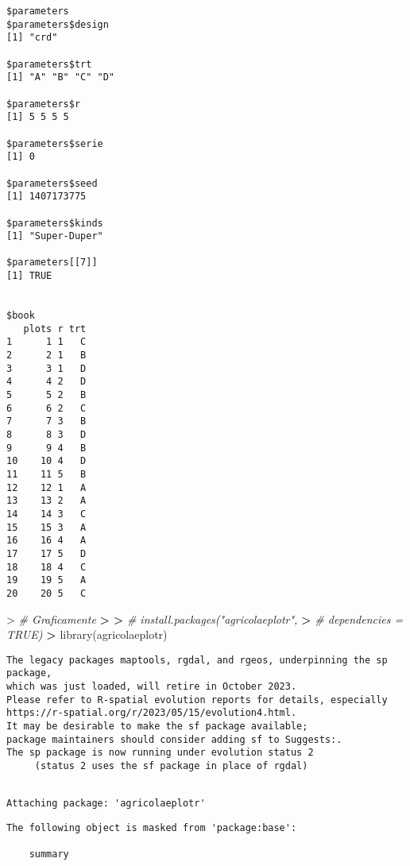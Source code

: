 \documentclass[
]{book}
\newenvironment{Shaded}{\begin{snugshade}}{\end{snugshade}}
\newcommand{\CommentTok}[1]{\textcolor[rgb]{0.56,0.35,0.01}{\textit{#1}}}
\newcommand{\ErrorTok}[1]{\textcolor[rgb]{0.64,0.00,0.00}{\textbf{#1}}}
\newcommand{\FunctionTok}[1]{\textcolor[rgb]{0.00,0.00,0.00}{#1}}
\newcommand{\NormalTok}[1]{#1}
\newcommand{\SpecialCharTok}[1]{\textcolor[rgb]{0.00,0.00,0.00}{#1}}
\begin{document}
\begin{verbatim}
$parameters
$parameters$design
[1] "crd"

$parameters$trt
[1] "A" "B" "C" "D"

$parameters$r
[1] 5 5 5 5

$parameters$serie
[1] 0

$parameters$seed
[1] 1407173775

$parameters$kinds
[1] "Super-Duper"

$parameters[[7]]
[1] TRUE


$book
   plots r trt
1      1 1   C
2      2 1   B
3      3 1   D
4      4 2   D
5      5 2   B
6      6 2   C
7      7 3   B
8      8 3   D
9      9 4   B
10    10 4   D
11    11 5   B
12    12 1   A
13    13 2   A
14    14 3   C
15    15 3   A
16    16 4   A
17    17 5   D
18    18 4   C
19    19 5   A
20    20 5   C
\end{verbatim}

\begin{Shaded}
\begin{Highlighting}[]
\SpecialCharTok{\textgreater{}} \CommentTok{\# Graficamente}
\ErrorTok{\textgreater{}} 
\ErrorTok{\textgreater{}} \CommentTok{\# install.packages("agricolaeplotr", }
\ErrorTok{\textgreater{}} \CommentTok{\#                  dependencies = TRUE)}
\ErrorTok{\textgreater{}} \FunctionTok{library}\NormalTok{(agricolaeplotr)}
\end{Highlighting}
\end{Shaded}

\begin{verbatim}
The legacy packages maptools, rgdal, and rgeos, underpinning the sp package,
which was just loaded, will retire in October 2023.
Please refer to R-spatial evolution reports for details, especially
https://r-spatial.org/r/2023/05/15/evolution4.html.
It may be desirable to make the sf package available;
package maintainers should consider adding sf to Suggests:.
The sp package is now running under evolution status 2
     (status 2 uses the sf package in place of rgdal)
\end{verbatim}

\begin{verbatim}

Attaching package: 'agricolaeplotr'
\end{verbatim}

\begin{verbatim}
The following object is masked from 'package:base':

    summary
\end{verbatim}
\end{document}
